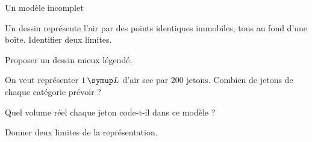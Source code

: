 \par\noindent\begin{minipage}{\linewidth}
\begin{exercice}[3]{Un modèle incomplet}
\begin{questions}
\item Un dessin représente l’air par des points identiques immobiles, tous au fond d’une boîte. Identifier deux limites.
\item Proposer un dessin mieux légendé.
\end{questions}
\end{exercice}
\end{minipage}
\label{defi-ex-2}
\begin{questions}
\item On veut représenter $1\unite L$ d’air sec par 200 jetons. Combien de jetons de chaque catégorie prévoir ?
\item Quel volume réel chaque jeton code-t-il dans ce modèle ?
\item Donner deux limites de la représentation.
\end{questions}
\pcGrille
